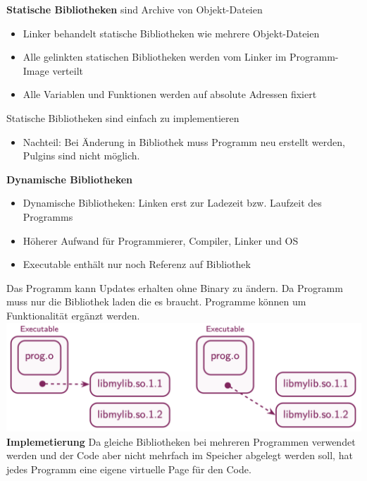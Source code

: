 \documentclass[8pt]{extarticle}
\let\oldtextbf\textbf
\renewcommand{\textbf}{\tiny\oldtextbf}
\begin{document}
\begin{multicols*}{5}
	\textbf{Statische Bibliotheken} sind Archive von Objekt-Dateien
	\begin{itemize} [noitemsep, topsep=0pt, leftmargin=*]
		\item Linker behandelt statische Bibliotheken wie mehrere Objekt-Dateien
		\item Alle gelinkten statischen Bibliotheken werden vom Linker im Programm-Image verteilt
		\item Alle Variablen und Funktionen werden auf absolute Adressen fixiert
	\end{itemize}
	Statische Bibliotheken sind einfach zu implementieren
	\begin{itemize} [noitemsep, topsep=0pt, leftmargin=*]
		\item Nachteil: Bei Änderung in Bibliothek muss Programm neu erstellt werden, Pulgins sind nicht möglich.
	\end{itemize}
	\textbf{Dynamische Bibliotheken}  
	\begin{itemize} [noitemsep, topsep=0pt, leftmargin=*]
		\item Dynamische Bibliotheken: Linken erst zur Ladezeit bzw. Laufzeit des Programms
		\item Höherer Aufwand für Programmierer, Compiler, Linker und OS
		\item Executable enthält nur noch Referenz auf Bibliothek
	\end{itemize}
	Das Programm kann Updates erhalten ohne Binary zu ändern. Da Programm muss nur die Bibliothek laden die es braucht. Programme können um Funktionalität ergänzt werden.\\
	\includegraphics[scale=0.3]{Dynamische_Bibliotheken.png}
	\textbf{Implemetierung} Da gleiche Bibliotheken bei mehreren Programmen verwendet werden und der Code aber nicht mehrfach im Speicher abgelegt werden soll, hat jedes Programm eine eigene virtuelle Page für den Code.\\
			

\end{multicols*}
\end{document}

